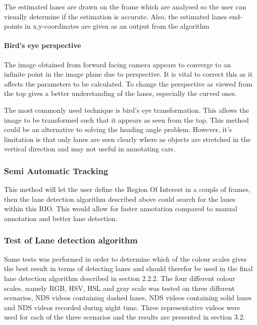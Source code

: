 The estimated lanes are drawn on the frame which are analysed so the user can visually determine if the estimation is accurate. Also, the estimated lanes end-points in x,y-coordinates are given as an output from the algorithm




\paragraph{Bird's eye perspective}
The image obtained from forward facing camera appears to converge to an infinite point in the image plane due to perspective. It is vital to correct this as it affects the parameters to be calculated. To change the perspective as viewed from the top gives a better understanding of the lanes, especially the curved ones.

The most commonly used technique is bird's eye transformation. This allows the image to be transformed such that it appears as seen from the top. This method could be an alternative to solving the heading angle problem. However, it's limitation is that only lanes are seen clearly where as objects are stretched in the vertical direction and may not useful in annotating cars. 


\subsubsection{Semi Automatic Tracking}
This method will let the user define the Region Of Interest in a couple of frames, then the lane detection algorithm described above could search for the lanes within this RIO. This would allow for faster annotation compared to manual annotation and better lane detection. 

\subsubsection{Test of Lane detection algorithm}

Some tests was performed in order to determine which of the colour scales gives the best result in terms of detecting lanes and should therefor be used in the final lane detection algorithm described in section 2.2.2. The four different colour scales, namely RGB, HSV, HSL and gray scale was tested on three different scenarios, NDS videos containing dashed lanes, NDS videos containing solid lanes and NDS videos recorded during night time. Three representative videos were used for each of the three scenarios and the results are presented in section 3.2. 

